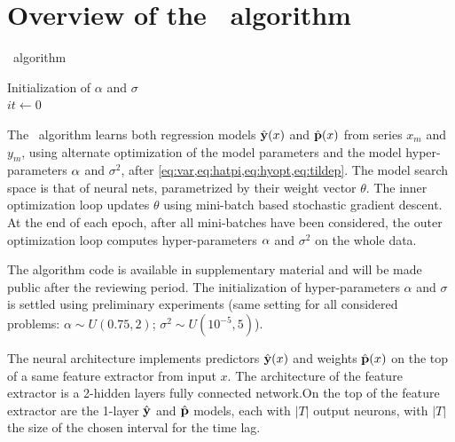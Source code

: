 \section{Overview of the \XX\ algorithm}\label{sec:model}
\begin{algorithm}[H]
  \SetAlgoLined
   \caption{\XX\ algorithm}
   Initialization of $\alpha$ and $\sigma$\\
   $it \longleftarrow 0$ \;
\end{algorithm}
 The \XX\ algorithm learns both regression models $\hat {\bf y}(x)$ and $\hat {\bf p}(x)$ from series $x_m$ and $y_m$, using alternate optimization of the model parameters and the model hyper-parameters ${\bf \alpha}$ and $\sigma^2$, after \cref{eq:var,eq:hatpi,eq:hyopt,eq:tildep}. The model search space is that of neural nets, parametrized by their weight vector $\theta$. The inner optimization loop updates $\theta$ using mini-batch based stochastic gradient descent. At the end of each epoch, after all mini-batches have been considered, the outer optimization loop computes hyper-parameters ${\bf \alpha}$ and $\sigma^2$ on the whole data. 
 
The algorithm code is available in supplementary material and will be made public after the reviewing period.
The initialization of hyper-parameters $\alpha$ and $\sigma$ is settled using preliminary experiments (same setting for all considered problems: $\alpha \sim U(0.75, 2)$; $\sigma^2 \sim U(10^{-5}, 5)$).

The neural architecture implements predictors $\hat {\bf y}(x)$ and weights $\hat {\bf p}(x)$ on the top of a same feature extractor from input $x$. %
The architecture of the feature extractor is a 2-hidden layers fully connected network.On the top of the feature extractor are the 1-layer $\hat {\bf y}$ and $\hat {\bf p}$ models, each with $|T|$ output neurons, with $|T|$ the size of the chosen interval for the time lag.

